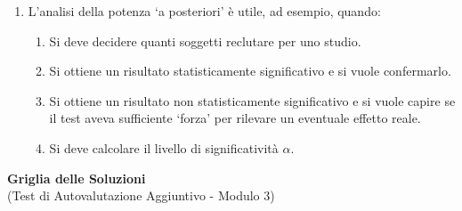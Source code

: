 \documentclass[12pt, a4paper]{article}
\newcommand{\alphaerr}{\alpha} %
\begin{document}
\begin{enumerate}
     \item L'analisi della potenza   `a posteriori' è utile, ad esempio, quando:
    \begin{enumerate}
        \item Si deve decidere quanti soggetti reclutare per uno studio.
        \item Si ottiene un risultato statisticamente significativo e si vuole confermarlo.
        \item Si ottiene un risultato non statisticamente significativo e si vuole capire se il test aveva sufficiente   `forza' per rilevare un eventuale effetto reale.
        \item Si deve calcolare il livello di significatività $\alphaerr$.
    \end{enumerate}


\end{enumerate} %

\newpage %

\begin{center}
    \Large\textbf{Griglia delle Soluzioni} \\
    \vspace{0.5cm}
    \normalsize{(Test di Autovalutazione Aggiuntivo - Modulo 3)}
\end{center}
\vspace{1cm}
\end{document}
